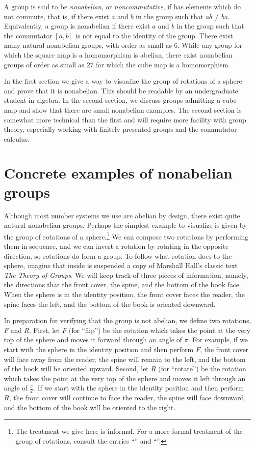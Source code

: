 \documentclass[12pt]{article}
\newcounter{123listctr}
\newcounter{123listcolonstylectr}
\begin{document}
A group is said to be \emph{nonabelian}, or \emph{noncommutative}, if
has elements which do not commute, that is, if there exist $a$ and $b$
in the group such that $ab \neq ba$.  Equivalently, a group is
nonabelian if there exist $a$ and $b$ in the group such that the
commutator $[a,b]$ is not equal to the identity of the group.  There
exist many natural nonabelian groups, with order as small as $6$.
While any group for which the square map is a homomorphism is abelian,
there exist nonabelian groups of order as small as $27$ for which the
cube map is a homomorphism.

In the first section we give a way to visualize the group of rotations
of a sphere and prove that it is nonabelian.  This should be readable
by an undergraduate student in algebra.  In the second section, we
discuss groups admitting a cube map and show that there are small 
nonabelian examples.  The second section is somewhat more technical 
than the first and will require more facility with group theory, 
especially working with finitely presented groups and the commutator 
calculus.

\section{Concrete examples of nonabelian groups}

Although most number systems we use are abelian by design, there exist
quite natural nonabelian groups.  Perhaps the simplest example to
visualize is given by the group of rotations of a sphere.\footnote{The
treatment we give here is informal.  For a more formal treatment of
the group of rotations, consult the entries ``'' and ``''.}  We can
compose two rotations by performing them in sequence, and we can
invert a rotation by rotating in the opposite direction, so rotations
do form a group.  To follow what rotation does to the sphere, imagine
that inside is suspended a copy of Marshall Hall's classic text {\it
The Theory of Groups}.  We will keep track of three pieces of
information, namely, the directions that the front cover, the spine, and
the bottom of the book face.  When the sphere is in the identity position,
the front cover faces the reader, the spine faces the left, and the
bottom of the book is oriented downward.

In preparation for verifying that the group is not abelian, we define
two rotations, $F$ and $R$.  First, let $F$ (for ``flip'') be the
rotation which takes the point at the very top of the sphere and moves
it forward through an angle of $\pi$.  For example, if we start with
the sphere in the identity position and then perform $F$, the front
cover will face away from the reader, the spine will remain to the
left, and the bottom of the book will be oriented upward.  Second, let
$R$ (for ``rotate'') be the rotation which takes the point at the
very top of the sphere and moves it left through an angle of
$\frac{\pi}{2}$.  If we start with the sphere in the identity position
and then perform $R$, the front cover will continue to face the
reader, the spine will face downward, and the bottom of the book will
be oriented to the right.
\end{document}
